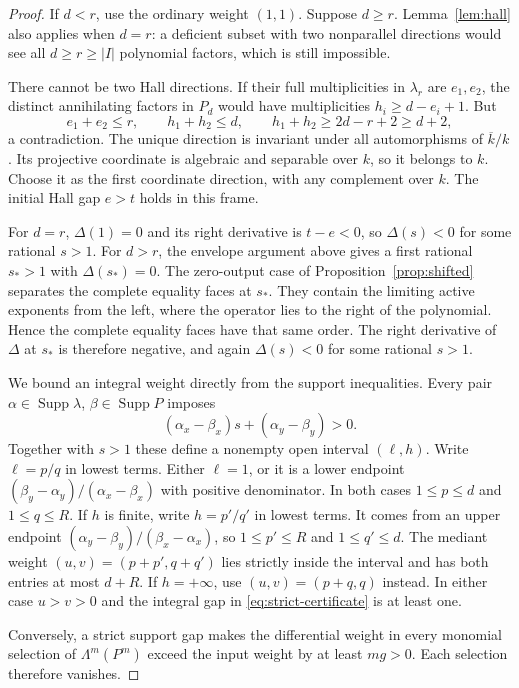 \documentclass[11pt]{article}
\newcommand{\Supp}{\operatorname{Supp}}
\begin{document}
\begin{proof}
If $d<r$, use the ordinary weight $(1,1)$.  Suppose $d\geq r$.
Lemma~\ref{lem:hall} also applies when $d=r$: a deficient subset with two
nonparallel directions would see all $d\geq r\geq |I|$ polynomial factors,
which is still impossible.

There cannot be two Hall directions.  If their full multiplicities in
$\lambda_r$ are $e_1,e_2$, the distinct annihilating factors in $P_d$
would have multiplicities $h_i\geq d-e_i+1$.  But
\[
 e_1+e_2\leq r,\qquad h_1+h_2\leq d,\qquad
 h_1+h_2\geq2d-r+2\geq d+2,
\]
a contradiction.  The unique direction is invariant under all
automorphisms of $\overline k/k$.  Its projective coordinate is algebraic
and separable over $k$, so it belongs to $k$.  Choose it as the first
coordinate direction, with any complement over $k$.  The initial Hall
gap $e>t$ holds in this frame.

For $d=r$, $\Delta(1)=0$ and its right derivative is $t-e<0$, so
$\Delta(s)<0$ for some rational $s>1$.  For $d>r$, the envelope argument
above gives a first rational $s_*>1$ with $\Delta(s_*)=0$.
The zero-output case of Proposition~\ref{prop:shifted} separates the
complete equality faces at $s_*$.  They contain the limiting active
exponents from the left, where the operator lies to the right of the
polynomial.  Hence the complete equality faces have that same order.
The right derivative of $\Delta$ at $s_*$ is therefore negative, and
again $\Delta(s)<0$ for some rational $s>1$.

We bound an integral weight directly from the support inequalities.
Every pair $\alpha\in\Supp\lambda$, $\beta\in\Supp P$ imposes
\[
 (\alpha_x-\beta_x)s+(\alpha_y-\beta_y)>0.
\]
Together with $s>1$ these define a nonempty open interval $(\ell,h)$.
Write $\ell=p/q$ in lowest terms.  Either $\ell=1$, or it is a lower
endpoint $(\beta_y-\alpha_y)/(\alpha_x-\beta_x)$ with positive denominator.
In both cases $1\leq p\leq d$ and $1\leq q\leq R$.
If $h$ is finite, write $h=p'/q'$ in lowest terms.  It comes from an
upper endpoint $(\alpha_y-\beta_y)/(\beta_x-\alpha_x)$, so
$1\leq p'\leq R$ and $1\leq q'\leq d$.
The mediant weight $(u,v)=(p+p',q+q')$ lies strictly inside the interval
and has both entries at most $d+R$.  If $h=+\infty$, use
$(u,v)=(p+q,q)$ instead.  In either case $u>v>0$ and the integral gap
in \eqref{eq:strict-certificate} is at least one.

Conversely, a strict support gap makes the differential weight in every
monomial selection of $\Lambda^m(P^m)$ exceed the input weight by at
least $mg>0$.  Each selection therefore vanishes.
\end{proof}
\end{document}
